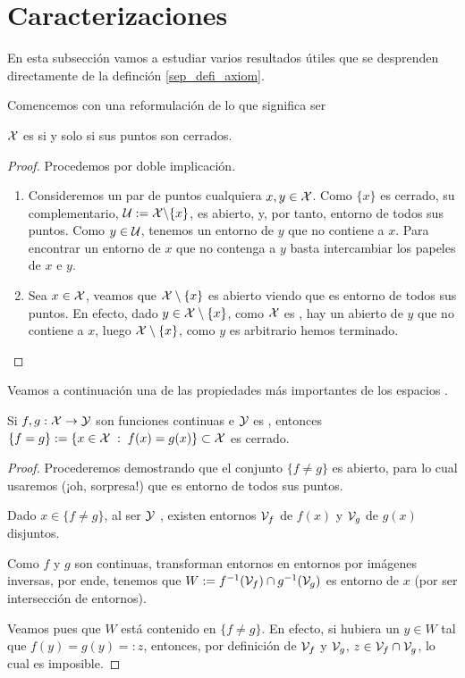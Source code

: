 \section{Caracterizaciones}

En esta subsección vamos a estudiar varios resultados útiles que se desprenden directamente de la definción \ref{sep_defi_axiom}.

Comencemos con una reformulación de lo que significa ser \frechet
\begin{prop}
	$\mathcal{X}$ es \frechet si y solo si sus puntos son cerrados.
\end{prop}
\begin{proof}Procedemos por doble implicación.
	\begin{enumerate}
		\item[\bla]Consideremos un par de puntos cualquiera $x,y\in \mathcal{X}$. Como $\{x\}$ es cerrado, su complementario, $\mathcal{U}:=\mathcal{X}\backslash \{x\}$, es abierto, y, por tanto, entorno de todos sus puntos. Como $y\in\mathcal{U}$, tenemos un entorno de $y$ que no contiene a $x$. Para encontrar un entorno de $x$ que no contenga a $y$ basta intercambiar los papeles de $x$ e $y$.
		\item[\bra] Sea $x\in\mathcal{X}$, veamos que $\mathcal{X}\setminus \{x\}$ es abierto viendo que es entorno de todos sus puntos. En efecto, dado $y\in\mathcal{X}\setminus \{x\}$, como $\mathcal{X}$ es \frechet, hay un abierto de $y$ que no contiene a $x$, luego $\mathcal{X}\setminus \{x\}$, como $y$ es arbitrario hemos terminado.\qedhere
	\end{enumerate}		 
\end{proof}
Veamos a continuación una de las propiedades más importantes de los espacios \hausdorff.
\begin{theo}
	Si $f,g:\mathcal{X}\to \mathcal{Y}$ son funciones continuas e $\mathcal{Y}$ es \hausdorff, entonces $\{f=g\}:=\{x\in\mathcal{X}\;:\; f(x)=g(x)\}\subset\mathcal{X}$ es cerrado. 
\end{theo}
\begin{proof}
	Procederemos demostrando que el conjunto $\{f\neq g\}$ es abierto, para lo cual usaremos (¡oh, sorpresa!) que es entorno de todos sus puntos.
	
	Dado $x\in \{f\neq g\}$, al ser $\mathcal{Y}$ \hausdorff, existen entornos $\mathcal{V}_f$ de $f(x)$ y $\mathcal{V}_g$ de $g(x)$ disjuntos. 
	
	Como $f$ y $g$ son continuas, transforman entornos en entornos por imágenes inversas, por ende, tenemos que $W:=f^{-1}(\mathcal{V}_f)\cap g^{-1}(\mathcal{V}_g)$ es entorno de $x$ (por ser intersección de entornos).
	
	Veamos pues que $W$ está contenido en $\{f\neq g\}$. En efecto, si hubiera un $y\in W$ tal que $f(y)=g(y)=:z$, entonces, por definición de $\mathcal{V}_f$ y $\mathcal{V}_g$, $z\in \mathcal{V}_f\cap \mathcal{V}_g$, lo cual es imposible.
\end{proof}

